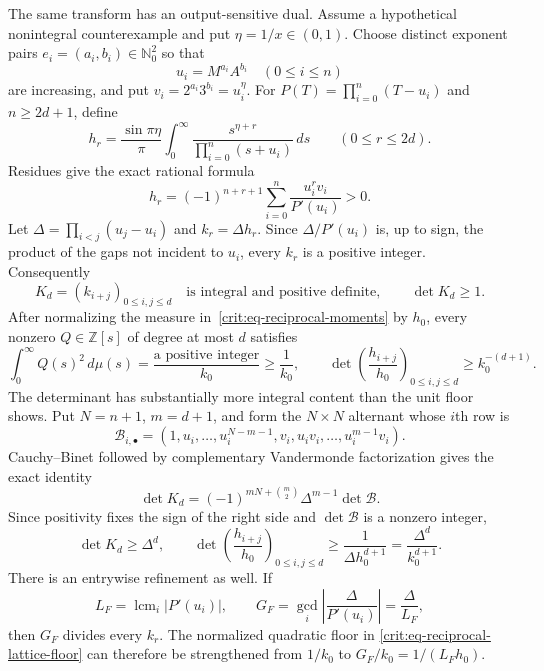 \documentclass[11pt,oneside]{article}
\theoremstyle{definition}
\theoremstyle{remark}
\newcommand{\Nzero}{\mathbb N_0}
\newcommand{\Z}{\mathbb Z}
\begin{document}
The same transform has an output-sensitive dual.  Assume a hypothetical nonintegral
counterexample and put $\eta=1/x\in(0,1)$.  Choose distinct exponent pairs
$e_i=(a_i,b_i)\in\Nzero^2$ so that
\[
 u_i=M^{a_i}A^{b_i}\quad(0\le i\le n)
\]
are increasing, and put $v_i=2^{a_i}3^{b_i}=u_i^\eta$.  For
$P(T)=\prod_{i=0}^n(T-u_i)$ and $n\ge2d+1$, define
\begin{equation}
 h_r=\frac{\sin\pi\eta}{\pi}
 \int_0^\infty\frac{s^{\eta+r}}{\prod_{i=0}^n(s+u_i)}\,ds
 \qquad(0\le r\le2d).
 \label{crit:eq-reciprocal-moments}
\end{equation}
Residues give the exact rational formula
\begin{equation}
 h_r=(-1)^{n+r+1}\sum_{i=0}^n\frac{u_i^rv_i}{P'(u_i)}>0.
 \label{crit:eq-reciprocal-barycentric}
\end{equation}
Let
$\Delta=\prod_{i<j}(u_j-u_i)$ and $k_r=\Delta h_r$.  Since
$\Delta/P'(u_i)$ is, up to sign, the product of the gaps not incident to $u_i$, every
$k_r$ is a positive integer.  Consequently
\begin{equation}
 K_d=(k_{i+j})_{0\le i,j\le d}
 \quad\text{is integral and positive definite},
 \qquad \det K_d\ge1.
 \label{crit:eq-integral-hankel-lattice}
\end{equation}
After normalizing the measure in~\eqref{crit:eq-reciprocal-moments} by $h_0$, every
nonzero $Q\in\Z[s]$ of degree at most $d$ satisfies
\begin{equation}
 \int_0^\infty Q(s)^2\,d\mu(s)
 =\frac{\text{a positive integer}}{k_0}\ge\frac1{k_0},
 \qquad
 \det\left(\frac{h_{i+j}}{h_0}\right)_{0\le i,j\le d}
 \ge k_0^{-(d+1)}.
 \label{crit:eq-reciprocal-lattice-floor}
\end{equation}
The determinant has substantially more integral content than the unit floor shows.  Put
$N=n+1$, $m=d+1$, and form the $N\times N$ alternant whose $i$th row is
\begin{equation}
 \mathcal B_{i,\bullet}=
 (1,u_i,\ldots,u_i^{N-m-1},v_i,u_iv_i,\ldots,u_i^{m-1}v_i).
 \label{crit:eq-reciprocal-alternant}
\end{equation}
Cauchy--Binet followed by complementary Vandermonde factorization gives the exact identity
\begin{equation}
 \boxed{
 \det K_d=(-1)^{mN+\binom m2}\Delta^{m-1}\det\mathcal B.}
 \label{crit:eq-reciprocal-alternant-identity}
\end{equation}
Since positivity fixes the sign of the right side and $\det\mathcal B$ is a nonzero integer,
\begin{equation}
 \det K_d\ge\Delta^d,
 \qquad
 \det\left(\frac{h_{i+j}}{h_0}\right)_{0\le i,j\le d}
 \ge\frac1{\Delta h_0^{d+1}}
 =\frac{\Delta^d}{k_0^{d+1}}.
 \label{crit:eq-reciprocal-strong-floor}
\end{equation}
There is an entrywise refinement as well.  If
\[
 L_F=\operatorname{lcm}_i|P'(u_i)|,
 \qquad G_F=\gcd_i\left|\frac{\Delta}{P'(u_i)}\right|=\frac{\Delta}{L_F},
\]
then $G_F$ divides every $k_r$.  The normalized quadratic floor in
\eqref{crit:eq-reciprocal-lattice-floor} can therefore be strengthened from $1/k_0$ to
$G_F/k_0=1/(L_Fh_0)$.
\end{document}

